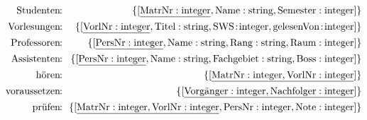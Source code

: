   \begin{eqnarray*}
    \mbox{Studenten}&\!\!:\!\!&\{[\underline {\mbox{MatrNr}: \mbox{integer}}, \mbox{Name}:\mbox{string}, \mbox{Semester}: \mbox{integer}]\}\\
    \mbox{Vorlesungen}&\!\!:\!\!&\{[\underline {\mbox{VorlNr}: \mbox{integer}}, \mbox{Titel}:\mbox{string}, \mbox{SWS}\!:\!\mbox{integer}, \mbox{gelesenVon}\!:\!\mbox{integer}]\}\\
    \mbox{Professoren}&\!\!:\!\!&\{[\underline {\mbox{PersNr}: \mbox{integer}}, \mbox{Name}:\mbox{string}, \mbox{Rang}:\mbox{string}, \mbox{Raum}:\mbox{integer}]\}\\
    \mbox{Assistenten}&\!\!:\!\!&\{[\underline {\mbox{PersNr}: \mbox{integer}}, \mbox{Name}: \mbox{string},\mbox{Fachgebiet}: \mbox{string}, \mbox{Boss}: \mbox{integer}]\}\\
    \mbox{hören}&\!\!:\!\!&\{[\underline {\mbox{MatrNr}: \mbox{integer}, \mbox{VorlNr}: \mbox{integer}}]\}\\
    \mbox{voraussetzen}&\!\!:\!\!&\{[\underline {\mbox{Vorgänger}: \mbox{integer},
      \mbox{Nachfolger}: \mbox{integer}}]\}\\
    \mbox{prüfen}&\!\!:\!\!&\{[\underline {\mbox{MatrNr}: \mbox{integer},
      \mbox{VorlNr}: \mbox{integer}}, \mbox{PersNr}: \mbox{integer},\mbox{Note}:{\rm
      integer}]\}
  \end{eqnarray*}
